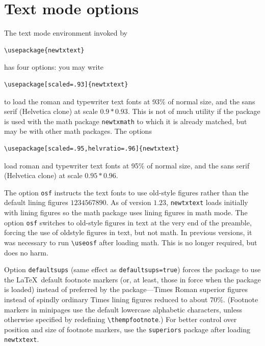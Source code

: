 \documentclass[11pt]{article}
\begin{document}
\section{Text mode options}
The text mode environment invoked by
\begin{verbatim}
\usepackage{newtxtext}
\end{verbatim}
has four options: you may write
\begin{verbatim}
\usepackage[scaled=.93]{newtxtext}
\end{verbatim}
to load the roman and typewriter text fonts at 93\% of normal size, and the sans serif (\textsf{Helvetica} clone) at scale $0.9*0.93$. This is not of much utility if the package is used with the math package {\tt newtxmath} to which it is already matched, but may be with other math packages. The options
\begin{verbatim}
\usepackage[scaled=.95,helvratio=.96]{newtxtext}
\end{verbatim}
load roman and typewriter text fonts at 95\% of normal size, and the sans serif (\textsf{Helvetica} clone) at scale $0.95*0.96$.

The option \texttt{osf} instructs the text fonts to use old-style figures  rather than the default lining figures $1234567890$. As of version $1.23$, {\tt newtxtext} loads initially with lining figures so the math package uses lining figures in math mode. The option {\tt osf} switches to old-style figures in text at the very end of the preamble, forcing the use of oldstyle figures in text, but not math. In previous versions, it was necessary to run 
\verb|\useosf| after loading math. This is no longer required, but does no harm.

Option {\tt defaultsups} (same effect as {\tt defaultsups=true}) forces the package to use the \LaTeX\ default footnote markers (or, at least, those in force when the package is loaded) instead of preferred by the package---Times Roman superior figures instead of spindly ordinary Times lining figures reduced to about 70\%. (Footnote markers in minipages use the default lowercase alphabetic characters, unless otherwise specified by redefining \verb|\thempfootnote|.) For better control over position and size of footnote markers, use the {\tt superiors} package after loading {\tt newtxtext}. 
\end{document}
